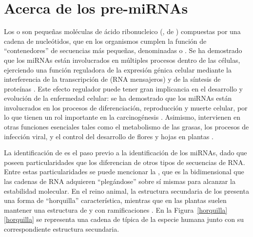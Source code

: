 %
%
%
\section{Acerca de los pre-miRNAs}
%
Los \e{} o  son pequeñas moléculas de
ácido ribonucleico (, de ) compuestas por
una cadena de nucleótidos, que en los organismos cumplen la función de
``contenedores'' de secuencias más pequeñas, denominadas 
o .
Se ha demostrado que los miRNAs están involucrados en múltiples
procesos dentro de las células, ejerciendo una función reguladora de
la expresión génica celular mediante la interferencia de la
transcripción de  ({RNA mensajeros}) y de la síntesis de
proteínas \cite{lee-mammal,bartel116,lili}.
Este efecto regulador puede tener gran implicancia en el desarrollo y
evolución de la enfermedad celular:
se ha demostrado que los miRNAs están involucrados en los procesos de
diferenciación, reproducción y muerte celular, por lo que tienen un
rol importante en la carcinogénesis \cite{aurora,lili}.
Asimismo, intervienen en otras funciones esenciales tales como el
metabolismo de las grasas, los procesos de infección viral, y el
control del desarrollo de flores y hojas en plantas
\cite{bartel116,lecellier}.

La identificación de  es el paso previo a la
identificación de los miRNAs, dado que poseen particularidades que los
diferencian de otros tipos de secuencias de RNA.
Entre estas particularidades se puede mencionar la , que es la  bidimensional que las cadenas de
RNA adquieren ``plegándose'' sobre sí mismas para alcanzar la
estabilidad molecular.
En el reino animal, la estructura secundaria de los 
presenta una forma de ``horquilla'' característica, mientras que en
las plantas suelen mantener una estructura de  y 
con ramificaciones \cite{bartel116,sewer}.
En la \iflatexml{}Figura~\ref{horquilla}\else\autoref{horquilla}\fi{}
se representa una cadena de \premirna{} típica de la especie humana
junto con su correspondiente estructura secundaria.
